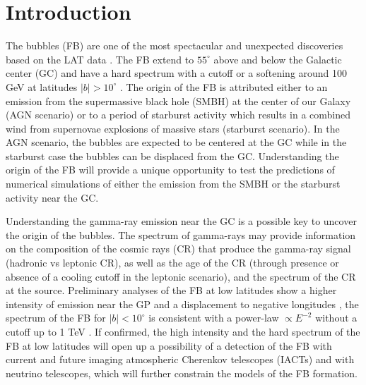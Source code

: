 \section{Introduction}



The \Fermi bubbles (FB) are one of the most spectacular and unexpected discoveries based on the \Fermi LAT data
\citep{2010ApJ...724.1044S}.
The FB extend to $55^\circ$ above and below the Galactic center (GC)
and have a hard spectrum with a cutoff or a softening around 100 GeV at latitudes $|b| > 10^\circ$ \citep{2014ApJ...793...64A}.
The origin of the FB is attributed either to an emission from the supermassive black hole (SMBH) at
the center of our Galaxy (AGN scenario) \citep{2010ApJ...724.1044S}
or to a period of starburst activity which results in a combined wind
from supernovae explosions of massive stars (starburst scenario). %
In the AGN scenario, the bubbles are expected to be centered at the GC while
in the starburst case the bubbles can be displaced from the GC.
Understanding the origin of the FB will provide a unique opportunity to test the predictions of numerical simulations 
of either the emission from the SMBH or the starburst activity near the GC.

Understanding the gamma-ray emission near the GC is a possible key to uncover the origin of the bubbles.
The spectrum of gamma-rays may provide information on the composition of the 
cosmic rays (CR) that produce the gamma-ray signal (hadronic vs leptonic CR),
as well as the age of the CR (through presence or absence of a cooling cutoff in the leptonic scenario),
and the spectrum of the CR at the source.
Preliminary analyses of the FB at low latitudes show a higher intensity of emission near the GP and a displacement
to negative longitudes \citep{2016ApJS..223...26A, 2017ApJ...840...43A},
the spectrum of the FB for $|b| < 10^\circ$ is consistent with a power-law $\propto E^{-2}$ 
without a cutoff up to 1 TeV \citep{2017ApJ...840...43A}.
If confirmed, the high intensity and the hard spectrum
of the FB at low latitudes will open up a possibility of a detection of the FB with current and future imaging atmospheric Cherenkov telescopes (IACTs)
and with neutrino telescopes, which will further constrain the models of the FB formation.

